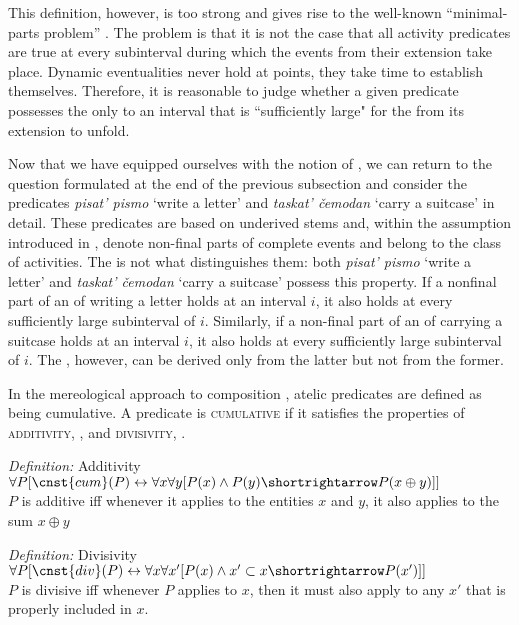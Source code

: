 \documentclass[output=paper,colorlinks,citecolor=brown,newtxmath]{langsci/langscibook}
\begin{document}
\noindent This definition, however, is too strong and gives rise to the well-known ``minimal-parts problem'' \citep{dowty1979word}. The problem is that it is not the case that all activity predicates are true at every subinterval during which the events from their extension take place. Dynamic eventualities never hold at points, they take time to establish themselves. Therefore, it is reasonable to judge whether a given predicate possesses the  only  to an interval that is ``sufficiently large" for the  from its extension to unfold.

Now that we have equipped ourselves with the notion of , we can return to the question formulated at the end of the previous subsection and consider the predicates \textit{pisat’ pismo} `write a letter’ and \textit{taskat’ čemodan} `carry a suitcase’ in detail. These predicates are based on underived  stems and, within the assumption introduced in , denote non-final parts of complete events and belong to the class of activities. The  is not what distinguishes them: both \textit{pisat’ pismo} `write a letter’ and \textit{taskat’ čemodan} `carry a suitcase’ possess this property. If a nonfinal part of an  of writing a letter holds at an interval $i$, it also holds at every sufficiently large subinterval of $i$. Similarly, if a non-final part of an  of carrying a suitcase holds at an interval $i$, it also holds at every sufficiently large subinterval of $i$. The , however, can be derived only from the latter but not from the former.

In the mereological approach to  composition \citep{krifka1989nominal,krifka1989nominal, krifka1992nominal,krifka1998origins}, atelic predicates are defined as being cumulative. A predicate is \textsc{cumulative} if it satisfies the properties of \textsc{additivity}, , and \textsc{divisivity}, .

\ea \label{ex:naumov:26}
\textit{Definition:} Additivity\smallskip\\
$\forall P[\cnst{cum}(P) \leftrightarrow \forall x \forall y[P(x) \wedge P(y) \shortrightarrow P(x \oplus y)]]$ \\
$P$ is additive iff whenever it applies to the entities $x$ and $y$, it also applies to the sum $x \oplus y$
\z

\ea \label{ex:naumov:27}
\textit{Definition:} Divisivity\smallskip\\
$\forall P[\cnst{div}(P) \leftrightarrow \forall x \forall x' [P(x) \wedge x' \subset x \shortrightarrow P(x')]]$ \\
$P$ is divisive iff whenever $P$ applies to $x$, then it must also apply to any $x'$ that is properly included in $x$.
\z
\end{document}
